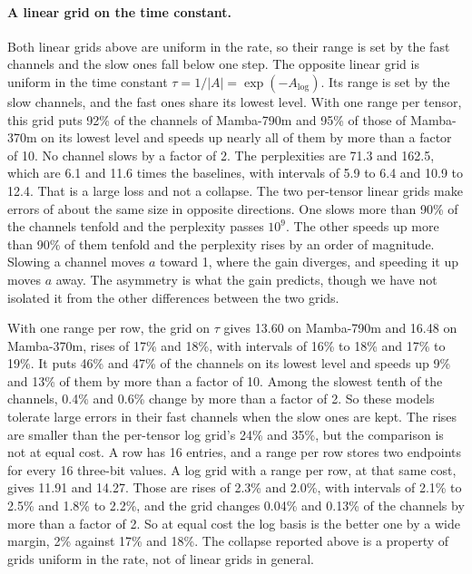 \documentclass[journal,onecolumn]{IEEEtran}
\begin{document}
\paragraph{A linear grid on the time constant.} Both linear grids above are uniform in the rate,
so their range is set by the fast channels and the slow ones fall below one step. The opposite
linear grid is uniform in the time constant $\tau = 1/|A| = \exp(-A_{\log})$. Its range is set by
the slow channels, and the fast ones share its lowest level. With one range per tensor, this grid
puts 92\% of the channels of Mamba-790m and 95\% of those of Mamba-370m on its lowest level and
speeds up nearly all of them by more than a factor of 10. No channel slows by a factor of 2. The
perplexities are 71.3 and 162.5, which are 6.1 and 11.6 times the baselines, with intervals of
5.9 to 6.4 and 10.9 to 12.4. That is a large
loss and not a collapse. The two per-tensor linear grids make errors of about the same size in
opposite directions. One slows more than 90\% of the channels tenfold and the perplexity passes
$10^{9}$. The other speeds up more than 90\% of them tenfold and the perplexity rises by an order
of magnitude. Slowing a channel moves $a$ toward 1, where the gain diverges, and speeding it up
moves $a$ away. The asymmetry is what the gain predicts, though we have not isolated it from the
other differences between the two grids.

With one range per row, the grid on $\tau$ gives 13.60 on Mamba-790m and 16.48 on Mamba-370m,
rises of 17\% and 18\%, with intervals of 16\% to 18\% and 17\% to 19\%. It puts 46\% and 47\% of the channels on its lowest level and speeds up
9\% and 13\% of them by more than a factor of 10. Among the slowest tenth of the channels, 0.4\%
and 0.6\% change by more than a factor of 2. So these models tolerate large errors in their fast
channels when the slow ones are kept. The rises are smaller than the per-tensor log grid's 24\%
and 35\%, but the comparison is not at equal cost. A row has 16 entries, and a range per row
stores two endpoints for every 16 three-bit values. A log grid with a range per row, at that same cost, gives 11.91 and 14.27. Those are
rises of 2.3\% and 2.0\%, with intervals of 2.1\% to 2.5\% and 1.8\% to 2.2\%, and the grid
changes 0.04\% and 0.13\% of the channels by more than a factor of 2. So at equal cost the log
basis is the better one by a wide margin, 2\% against 17\% and 18\%. The collapse reported above is a
property of grids uniform in the rate, not of linear grids in general.
\end{document}

